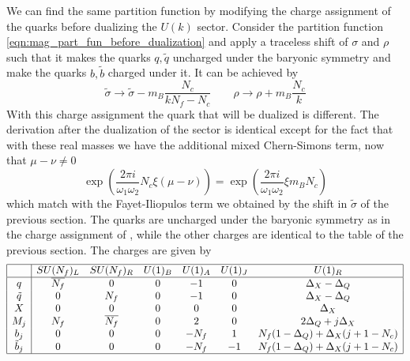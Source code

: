 We can find the same partition function by modifying the charge assignment of the quarks before dualizing the $U(k)$ sector.
Consider the partition function \eqref{eqn:mag_part_fun_before_dualization} and apply a traceless shift of $\sigma$ and $\rho$ such that it makes the quarks $q,\tilde{q} $ uncharged under the baryonic symmetry and make the quarks $b,\tilde{b}$ charged under it.
It can be achieved by
\begin{equation}
\tilde{\sigma} \longrightarrow \tilde{\sigma} - m_B \frac{N_c}{k N_f -N_c} \qquad \rho \longrightarrow \rho + m_B \frac{N_c}{k}
\end{equation}
With this charge assignment the quark that will be dualized is different.
The derivation after the dualization of the sector is identical except for the fact that with these real masses we have the additional mixed Chern-Simons term,
now that $\mu - \nu \neq 0$
\begin{equation}
\exp{ \left( \frac{2 \pi i}{\omega_1 \omega_2 } N_c \xi (\mu - \nu) \right)} = \exp{ \left( \frac{2 \pi i}{\omega_1 \omega_2 } \xi m_B N_c  \right)} 
\end{equation}
which match with the Fayet-Iliopulos term we obtained by the shift in $\tilde{\sigma} $ of the previous section.
The quarks are uncharged under the baryonic symmetry as in the charge assignment of \cite{Nii:2014jsa}, while the other charges are identical to the table of the previous section.
The charges are given by
\begin{equation}
\begin{array}{|c |c c c c c c |}
\hline
 & SU(N_f)_L & SU(N_f)_R & U(1)_B & U(1)_A & U(1)_J & U(1)_R  \\
\hline
q & \overline{N_f} & 0  & 0  & -1  & 0  & \Delta_X - \Delta_Q \\
\tilde{q}   & 0  &N_f & 0 & - 1  & 0 &\Delta_X - \Delta_Q \\
X & 0 & 0 & 0 & 0 &0 & \Delta_X \\
M_j  & N_f & \overline{N_f} & 0 & 2 & 0 & 2 \Delta_Q + j \Delta_X\\
b_j & 0  & 0 & 0  &   -N_f &  1   & N_f ( 1 - \Delta_Q) + \Delta_X (j +1  - N_c)  \\
 \tilde{b} _j & 0  & 0 & 0  &   - N_f &  -1   & N_f ( 1 - \Delta_Q) + \Delta_X (j +1 - N_c)  \\
\hline
\end{array}
\end{equation}
